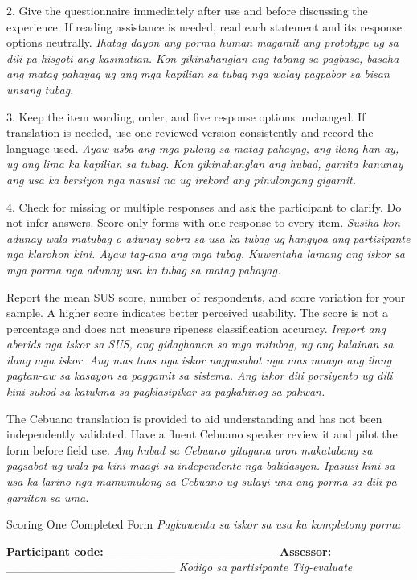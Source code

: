 2. Give the questionnaire immediately after use and before discussing the experience. If reading assistance is needed, read each statement and its response options neutrally. \textit{Ihatag dayon ang porma human magamit ang prototype ug sa dili pa hisgoti ang kasinatian. Kon gikinahanglan ang tabang sa pagbasa, basaha ang matag pahayag ug ang mga kapilian sa tubag nga walay pagpabor sa bisan unsang tubag.}

3. Keep the item wording, order, and five response options unchanged. If translation is needed, use one reviewed version consistently and record the language used. \textit{Ayaw usba ang mga pulong sa matag pahayag, ang ilang han-ay, ug ang lima ka kapilian sa tubag. Kon gikinahanglan ang hubad, gamita kanunay ang usa ka bersiyon nga nasusi na ug irekord ang pinulongang gigamit.}

4. Check for missing or multiple responses and ask the participant to clarify. Do not infer answers. Score only forms with one response to every item. \textit{Susiha kon adunay wala matubag o adunay sobra sa usa ka tubag ug hangyoa ang partisipante nga klarohon kini. Ayaw tag-ana ang mga tubag. Kuwentaha lamang ang iskor sa mga porma nga adunay usa ka tubag sa matag pahayag.}

Report the mean SUS score, number of respondents, and score variation for your sample. A higher score indicates better perceived usability. The score is not a percentage and does not measure ripeness classification accuracy. \textit{Ireport ang aberids nga iskor sa SUS, ang gidaghanon sa mga mitubag, ug ang kalainan sa ilang mga iskor. Ang mas taas nga iskor nagpasabot nga mas maayo ang ilang pagtan-aw sa kasayon sa paggamit sa sistema. Ang iskor dili porsiyento ug dili kini sukod sa katukma sa pagklasipikar sa pagkahinog sa pakwan.}

The Cebuano translation is provided to aid understanding and has not been independently validated. Have a fluent Cebuano speaker review it and pilot the form before field use. \textit{Ang hubad sa Cebuano gitagana aron makatabang sa pagsabot ug wala pa kini maagi sa independente nga balidasyon. Ipasusi kini sa usa ka larino nga mamumulong sa Cebuano ug sulayi una ang porma sa dili pa gamiton sa uma.}

Scoring One Completed Form \textit{Pagkuwenta sa iskor sa usa ka kompletong porma}

\textbf{Participant code:} \_\allowbreak{}\_\allowbreak{}\_\allowbreak{}\_\allowbreak{}\_\allowbreak{}\_\allowbreak{}\_\allowbreak{}\_\allowbreak{}\_\allowbreak{}\_\allowbreak{}\_\allowbreak{}\_\allowbreak{}\_\allowbreak{}\_\allowbreak{}\_\allowbreak{}\_\allowbreak{}\_\allowbreak{}\_\allowbreak{}\_\allowbreak{}\_\allowbreak{} \textbf{Assessor:} \_\allowbreak{}\_\allowbreak{}\_\allowbreak{}\_\allowbreak{}\_\allowbreak{}\_\allowbreak{}\_\allowbreak{}\_\allowbreak{}\_\allowbreak{}\_\allowbreak{}\_\allowbreak{}\_\allowbreak{}\_\allowbreak{}\_\allowbreak{}\_\allowbreak{}\_\allowbreak{}\_\allowbreak{}\_\allowbreak{}\_\allowbreak{}\_\allowbreak{} \textit{Kodigo sa partisipante Tig-evaluate}

